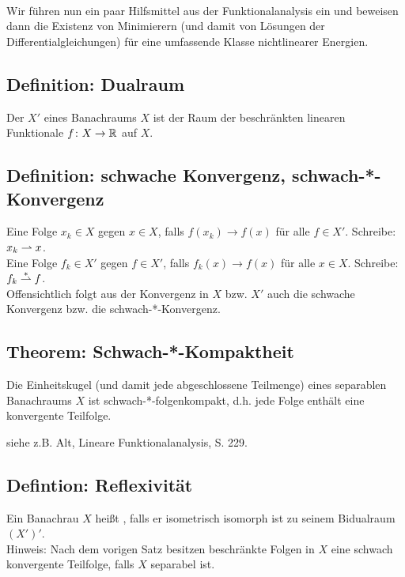 \mbox{} \\
Wir führen nun ein paar Hilfsmittel aus der Funktionalanalysis ein und beweisen dann die Existenz von Minimierern (und damit von Lösungen der Differentialgleichungen) für eine umfassende Klasse nichtlinearer Energien.

\subsection{Definition: Dualraum}
\label{def_76}
	Der  $X'$ \marginnote{[76]} eines Banachraums $X$ ist der Raum der beschränkten linearen Funktionale $f\colon X \rightarrow \mathbb{R}$ auf $X$.

\subsection{Definition: schwache Konvergenz, schwach-*-Konvergenz}
\label{def_77}
	Eine Folge $x_k \in X$  gegen $x \in X$, falls $f(x_k) \rightarrow f(x)$ für alle $f \in X'$. Schreibe: $x_k \rightharpoonup x$. \marginnote{[77]} \\
	Eine Folge $f_k \in X'$  gegen $f \in X'$, falls $f_k(x) \rightarrow f(x)$ für alle $x \in X$. Schreibe: $f_k \overset{*}{\rightharpoonup} f$.  \\
	Offensichtlich folgt aus der Konvergenz in $X$ bzw. $X'$ auch die schwache Konvergenz bzw. die schwach-*-Konvergenz.
	
\subsection{Theorem: Schwach-*-Kompaktheit}
\label{thm_78}
	Die Einheitskugel (und damit jede abgeschlossene Teilmenge)\marginnote{[78]} eines separablen Banachraums $X$ ist schwach-*-folgenkompakt, d.h. jede Folge enthält eine konvergente Teilfolge.

	siehe z.B. Alt, \glqq Lineare Funktionalanalysis\grqq, S. 229.
	
\subsection{Defintion: Reflexivität}
\label{def_79}
	Ein Banachrau $X$ heißt , falls er isometrisch isomorph ist zu seinem Bidualraum $(X')'$. \marginnote{[79]} \\
	Hinweis: Nach dem vorigen Satz besitzen beschränkte Folgen in $X$ eine schwach konvergente Teilfolge, falls $X$ separabel ist.

